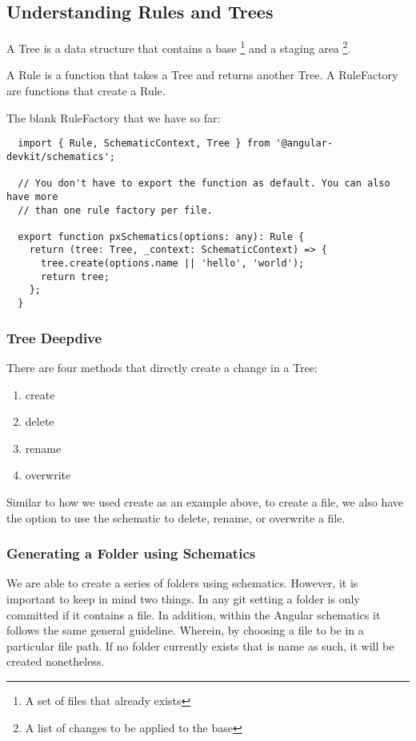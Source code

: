 \subsection{ Understanding Rules and Trees }
A Tree is a data structure that contains a base \footnote{A set of files that already exists}
and a staging area \footnote{A list of changes to be applied to the base}.

A Rule is a function that takes a Tree and returns another Tree. A RuleFactory
are functions that create a Rule.

The blank RuleFactory that we have so far:

\begin{lstlisting}
  import { Rule, SchematicContext, Tree } from '@angular-devkit/schematics';

  // You don't have to export the function as default. You can also have more
  // than one rule factory per file.

  export function pxSchematics(options: any): Rule {
    return (tree: Tree, _context: SchematicContext) => {
      tree.create(options.name || 'hello', 'world');
      return tree;
    };
  }

\end{lstlisting}


\subsubsection{ Tree Deepdive}
There are four methods that directly create a change in a Tree:
\begin{enumerate}
  \item create
  \item delete
  \item rename
  \item overwrite
\end{enumerate}

Similar to how we used create as an example above, to create a file, we also
have the option to use the schematic to delete, rename, or overwrite a file.

\subsubsection{ Generating a Folder using Schematics }
We are able to create a series of folders using schematics. However, it is
important to keep in mind two things. In any git setting a folder is only
committed if it contains a file. In addition, within the Angular schematics
it follows the same general guideline. Wherein, by choosing a file to be in a
particular file path. If no folder currently exists that is name as such, it
will be created nonetheless.
